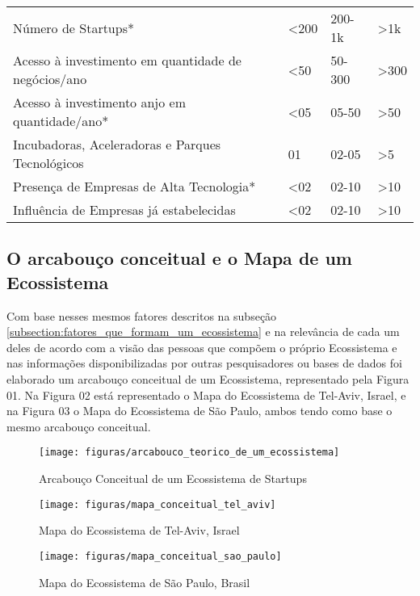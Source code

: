 \begin{table}[!htb]
\begin{tabular}{llll}
Número de Startups*                                        &    <200    &   200-1k   &    >1k   \\
Acesso à investimento em quantidade de negócios/ano        &    <50     &   50-300   &    >300  \\
Acesso à investimento anjo em quantidade/ano*              &    <05     &   05-50    &    >50   \\
Incubadoras, Aceleradoras e Parques Tecnológicos           &     01     &    02-05   &    >5    \\
Presença de Empresas de Alta Tecnologia*                   &    <02     &   02-10    &    >10   \\
Influência de Empresas já estabelecidas                    &    <02     &   02-10    &    >10   \\
\end{tabular}
\end{table}

\subsection{O arcabouço conceitual e o Mapa de um Ecossistema}
\label{subsection:arcabouco_conceitual_e_modelo}

Com base nesses mesmos fatores descritos na subseção \ref{subsection:fatores_que_formam_um_ecossistema} e na relevância de cada um deles de acordo com a visão das pessoas que compõem o próprio Ecossistema e nas informações disponibilizadas por outras pesquisadores ou bases de dados foi elaborado um arcabouço conceitual de um Ecossistema, representado pela Figura 01. Na Figura 02 está representado o Mapa do Ecossistema de Tel-Aviv, Israel, e na Figura 03 o Mapa do Ecossistema de São Paulo, ambos tendo como base o mesmo arcabouço conceitual.

\begin{figure}[!htb]
\centering
\texttt{[image: figuras/arcabouco\_teorico\_de\_um\_ecossistema]}
\caption{Arcabouço Conceitual de um Ecossistema de Startups}
\label{Rotulo}
\end{figure}

\begin{figure}[!htbp]
\centering
\texttt{[image: figuras/mapa\_conceitual\_tel\_aviv]}
\caption{Mapa do Ecossistema de Tel-Aviv, Israel}
\label{Rotulo}
\end{figure}

\begin{figure}[!htbp]
\centering
\texttt{[image: figuras/mapa\_conceitual\_sao\_paulo]}
\caption{Mapa do Ecossistema de São Paulo, Brasil}
\label{Rotulo}
\end{figure}

